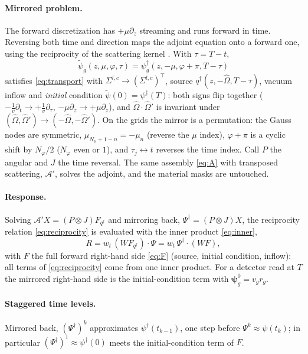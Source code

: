 \documentclass[11pt,a4paper]{article}
\newcommand{\Om}{\hat{\Omega}}
\newcommand{\kron}{\otimes}
\begin{document}
\paragraph{Mirrored problem.} The forward discretization has $+\mu\partial_z$ streaming and runs forward in time. Reversing both time and direction maps the adjoint equation onto a forward one, using the reciprocity of the scattering kernel \cite{Acosta}. With $\tau=T-t$,
\begin{equation}
\tilde\psi_g(z,\mu,\varphi,\tau)=\psi^\dagger_g(z,-\mu,\varphi+\pi,T-\tau)
\end{equation}
satisfies \eqref{eq:transport} with $\Sigma^{l,c}\to(\Sigma^{l,c})^{\!\top}$, source $q^\dagger(z,-\Om,T-\tau)$, vacuum inflow and \emph{initial} condition $\tilde\psi(0)=\psi^\dagger(T)$: both signs flip together ($-\frac1v\partial_t\to+\frac1v\partial_\tau$, $-\mu\partial_z\to+\mu\partial_z$), and $\Om\cdot\Om'$ is invariant under $(\Om,\Om')\to(-\Om,-\Om')$. On the grids the mirror is a permutation: the Gauss nodes are symmetric, $\mu_{N_\mu+1-n}=-\mu_n$ (reverse the $\mu$ index), $\varphi+\pi$ is a cyclic shift by $N_\varphi/2$ ($N_\varphi$ even or $1$), and $\tau_j\leftrightarrow t$ reverses the time index. Call $P$ the angular and $J$ the time reversal. The same assembly \eqref{eq:A} with transposed scattering, $\mathcal A'$, solves the adjoint, and the material masks are untouched.

\paragraph{Response.} Solving $\mathcal A'X=(P\kron J)F_{q^\dagger}$ and mirroring back, $\Psi^\dagger=(P\kron J)X$, the reciprocity relation \eqref{eq:reciprocity} is evaluated with the inner product \eqref{eq:inner},
\begin{equation}
R=w_t\,(WF_{q^\dagger})\cdot\Psi=w_t\,\Psi^\dagger\cdot(WF),
\label{eq:R-discrete}
\end{equation}
with $F$ the full forward right-hand side \eqref{eq:F} (source, initial condition, inflow): all terms of \eqref{eq:reciprocity} come from one inner product. For a detector read at $T$ the mirrored right-hand side is the initial-condition term with $\bm\psi^0_g=v_gr_g$.

\paragraph{Staggered time levels.} Mirrored back, $(\Psi^\dagger)^k$ approximates $\psi^\dagger(t_{k-1})$, one step before $\Psi^k\approx\psi(t_k)$; in particular $(\Psi^\dagger)^1\approx\psi^\dagger(0)$ meets the initial-condition term of $F$.
\end{document}
